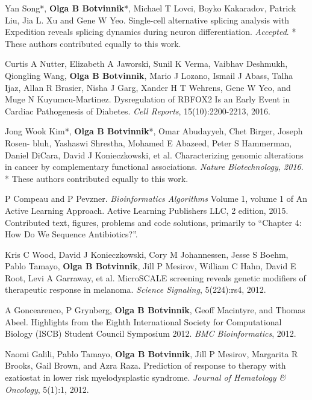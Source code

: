 \begin{frontmatter}
\begin{vitapage}
\begin{publications}
\item Yan Song*, \textbf{Olga B Botvinnik}*, Michael T Lovci, Boyko Kakaradov, Patrick Liu, Jia L. Xu and Gene W Yeo. Single-cell alternative splicing analysis with Expedition reveals splicing dynamics during neuron differentiation. \emph{Accepted}. * These authors contributed equally to this work.

\item Curtis A Nutter, Elizabeth A Jaworski, Sunil K Verma, Vaibhav Deshmukh, Qiongling Wang, \textbf{Olga B Botvinnik}, Mario J Lozano, Ismail J Abass, Talha Ijaz, Allan R Brasier, Nisha J Garg, Xander H T Wehrens, Gene W Yeo, and Muge N Kuyumcu-Martinez. Dysregulation of RBFOX2 Is an Early Event in Cardiac Pathogenesis of Diabetes. \emph{Cell Reports}, 15(10):2200-2213, 2016.

\item Jong Wook Kim*, \textbf{Olga B Botvinnik}*, Omar Abudayyeh, Chet Birger, Joseph Rosen- bluh, Yashaswi Shrestha, Mohamed E Abazeed, Peter S Hammerman, Daniel DiCara, David J Konieczkowski, et al. Characterizing genomic alterations in cancer by complementary functional associations. \emph{Nature Biotechnology, 2016}. * These authors contributed equally to this work.

\item P Compeau and P Pevzner. \emph{Bioinformatics Algorithms} Volume 1, volume 1 of An Active Learning Approach. Active Learning Publishers LLC, 2 edition, 2015. Contributed text, figures, problems and code solutions, primarily to ``Chapter 4: How Do We Sequence Antibiotics?''.

\item Kris C Wood, David J Konieczkowski, Cory M Johannessen, Jesse S Boehm, Pablo Tamayo, \textbf{Olga B Botvinnik}, Jill P Mesirov, William C Hahn, David E Root, Levi A Garraway, et al. MicroSCALE screening reveals genetic modifiers of therapeutic response in melanoma. \emph{Science Signaling}, 5(224):rs4, 2012.

\item A Goncearenco, P Grynberg, \textbf{Olga B Botvinnik}, Geoff Macintyre, and Thomas Abeel. Highlights from the Eighth International Society for Computational Biology (ISCB) Student Council Symposium 2012. \emph{BMC Bioinformatics}, 2012.

\item Naomi Galili, Pablo Tamayo, \textbf{Olga B Botvinnik}, Jill P Mesirov, Margarita R Brooks, Gail Brown, and Azra Raza. Prediction of response to therapy with ezatiostat in lower risk myelodysplastic syndrome. \emph{Journal of Hematology \& Oncology}, 5(1):1, 2012.


\end{publications}
\end{vitapage}
\end{frontmatter}
